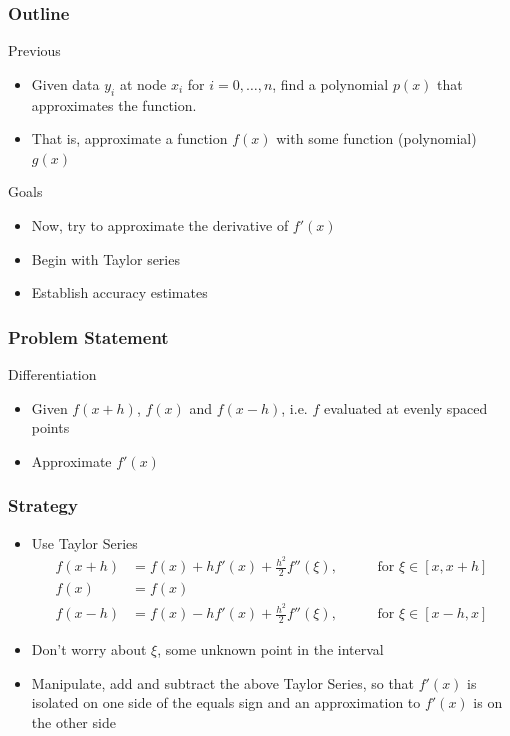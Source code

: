 \documentclass[10pt]{beamer}
\begin{document}
\begin{frame}
\frametitle{Outline}
Previous
\begin{itemize}
  \item Given data $y_i$ at node $x_i$ for $i=0,\dots,n$,
find a polynomial $p(x)$ that approximates the function.
  \item That is, approximate a function $f(x)$ with some function
(polynomial) $g(x)$
\end{itemize}
\bigskip
Goals
\begin{itemize}
  \item Now, try to approximate the derivative of $f'(x)$
  \item Begin with Taylor series
  \item Establish accuracy estimates
\end{itemize}
\end{frame}
\begin{frame}
\frametitle{Problem Statement}
\begin{block}{Differentiation}
  \begin{itemize}
      \item Given $f(x+h)$, $f(x)$ and $f(x-h)$, i.e. $f$ evaluated at evenly spaced points
      \item Approximate $f'(x)$
  \end{itemize}
\end{block}
\end{frame}
\begin{frame}
\frametitle{Strategy}
\begin{itemize}
    \item Use Taylor Series
    \begin{align*}
        f(x+h) &= f(x) + h f'(x) + \frac{h^2}{2}f''(\xi),\;\;\;\;\;\;\;\;\; \mbox{ for } \xi \in [x, x+h]\\
        f(x)   &= f(x)\\
        f(x-h) &= f(x) - h f'(x) + \frac{h^2}{2}f''(\xi),\;\;\;\;\;\;\;\;\; \mbox{ for } \xi \in [x-h, x]
    \end{align*}
    \item<2-> Don't worry about $\xi$, some unknown point in the interval
    \item<3-> Manipulate, add and subtract the above Taylor Series, so 
              that $f'(x)$ is isolated on one side of the equals sign and 
              an approximation to $f'(x)$ is on the other side
\end{itemize}
\end{frame}
\end{document}

